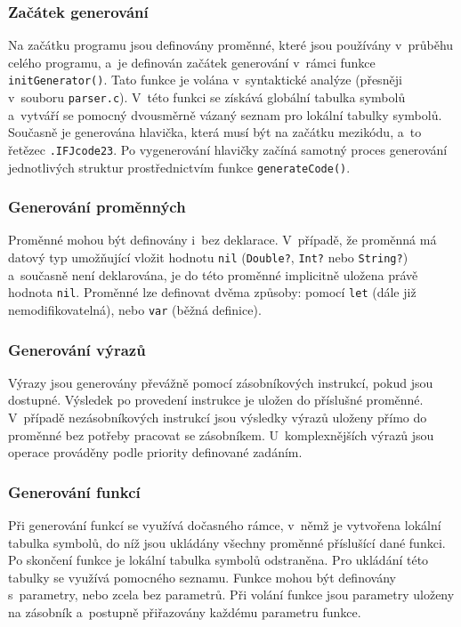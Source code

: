 \documentclass[a4paper, 11pt]{article}
\begin{document}
\subsubsection{Začátek generování}
    Na začátku programu jsou definovány proměnné, které jsou používány v~průběhu celého programu, a~je definován začátek generování v~rámci funkce \texttt{initGenerator()}.
    Tato funkce je volána v~syntaktické analýze (přesněji v~souboru \texttt{parser.c}).
    V~této funkci se získává globální tabulka symbolů a~vytváří se pomocný dvousměrně vázaný seznam pro lokální tabulky symbolů.
    Současně je generována hlavička, která musí být na začátku mezikódu, a~to řetězec \texttt{.IFJcode23}.
    Po vygenerování hlavičky začíná samotný proces generování jednotlivých struktur prostřednictvím funkce \texttt{generateCode()}.

\subsubsection{Generování proměnných}
    Proměnné mohou být definovány i~bez deklarace.
    V~případě, že proměnná má datový typ umožňující vložit hodnotu \texttt{nil} (\texttt{Double?}, \texttt{Int?} nebo \texttt{String?}) a~současně není deklarována, je do této proměnné implicitně uložena právě hodnota \texttt{nil}.
    Proměnné lze definovat dvěma způsoby: pomocí \texttt{let} (dále již nemodifikovatelná), nebo \texttt{var} (běžná definice).

\subsubsection{Generování výrazů}
    Výrazy jsou generovány převážně pomocí zásobníkových instrukcí, pokud jsou dostupné.
    Výsledek po provedení instrukce je uložen do příslušné proměnné.
    V~případě nezásobníkových instrukcí jsou výsledky výrazů uloženy přímo do proměnné bez potřeby pracovat se zásobníkem.
    U~komplexnějších výrazů jsou operace prováděny podle priority definované zadáním.

\subsubsection{Generování funkcí}
    Při generování funkcí se využívá dočasného rámce, v~němž je vytvořena lokální tabulka symbolů, do níž jsou ukládány všechny proměnné příslušící dané funkci.
    Po skončení funkce je lokální tabulka symbolů odstraněna.
    Pro ukládání této tabulky se využívá pomocného seznamu. Funkce mohou být definovány s~parametry, nebo zcela bez parametrů.
    Při volání funkce jsou parametry uloženy na zásobník a~postupně přiřazovány každému parametru funkce.
\end{document}
